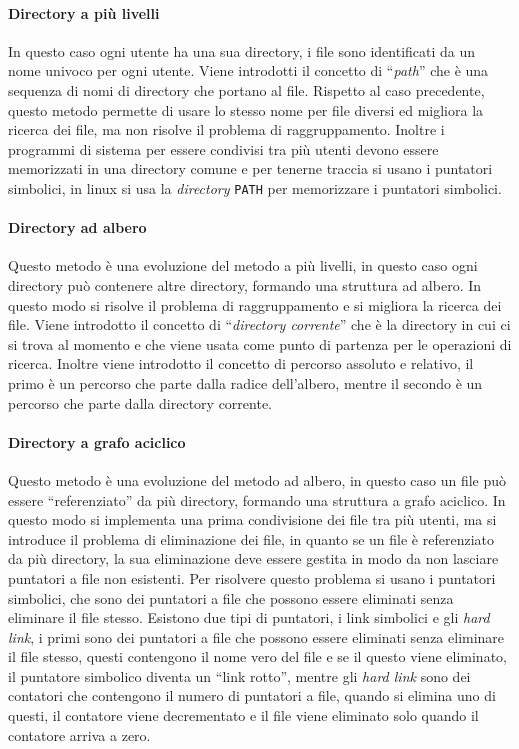         \paragraph{Directory a più livelli} In questo caso ogni utente ha una sua directory, i file sono identificati da un nome univoco per ogni utente. Viene introdotti il concetto di ``\textit{path}'' che è una sequenza di nomi di directory che portano al file. Rispetto al caso precedente, questo metodo permette di usare lo stesso nome per file diversi ed migliora la ricerca dei file, ma non risolve il problema di raggruppamento. Inoltre i programmi di sistema per essere condivisi tra più utenti devono essere memorizzati in una directory comune e per tenerne traccia si usano i puntatori simbolici, in linux si usa la \textit{directory} \texttt{PATH} per memorizzare i puntatori simbolici.
        \paragraph{Directory ad albero} Questo metodo è una evoluzione del metodo a più livelli, in questo caso ogni directory può contenere altre directory, formando una struttura ad albero. In questo modo si risolve il problema di raggruppamento e si migliora la ricerca dei file. Viene introdotto il concetto di ``\textit{directory corrente}'' che è la directory in cui ci si trova al momento e che viene usata come punto di partenza per le operazioni di ricerca. Inoltre viene introdotto il concetto di percorso assoluto e relativo, il primo è un percorso che parte dalla radice dell'albero, mentre il secondo è un percorso che parte dalla directory corrente.
        \paragraph{Directory a grafo aciclico} Questo metodo è una evoluzione del metodo ad albero, in questo caso un file può essere ``referenziato'' da più directory, formando una struttura a grafo aciclico. In questo modo si implementa una prima condivisione dei file tra più utenti, ma si introduce il problema di eliminazione dei file, in quanto se un file è referenziato da più directory, la sua eliminazione deve essere gestita in modo da non lasciare puntatori a file non esistenti. Per risolvere questo problema si usano i puntatori simbolici, che sono dei puntatori a file che possono essere eliminati senza eliminare il file stesso. Esistono due tipi di puntatori, i link simbolici e gli \textit{hard link}, i primi sono dei puntatori a file che possono essere eliminati senza eliminare il file stesso, questi contengono il nome vero del file e se il questo viene eliminato, il puntatore simbolico diventa un ``link rotto'', mentre gli \textit{hard link} sono dei contatori che contengono il numero di puntatori a file, quando si elimina uno di questi, il contatore viene decrementato e il file viene eliminato solo quando il contatore arriva a zero. 
